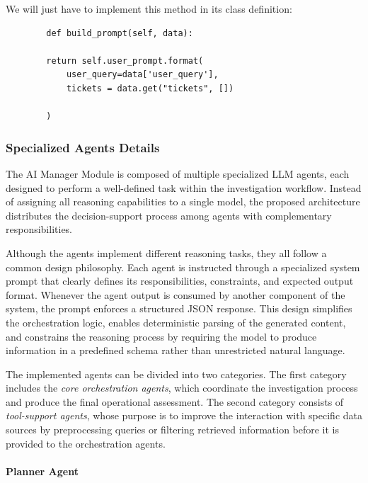 We will just have to implement this method in its class definition:
\begin{verbatim}
        def build_prompt(self, data):

        return self.user_prompt.format(
            user_query=data['user_query'],
            tickets = data.get("tickets", [])

        )
\end{verbatim}


\subsubsection{Specialized Agents Details}

The AI Manager Module is composed of multiple specialized LLM agents, each designed to perform a well-defined task within the investigation workflow. Instead of assigning all reasoning capabilities to a single model, the proposed architecture distributes the decision-support process among agents with complementary responsibilities.

Although the agents implement different reasoning tasks, they all follow a common design philosophy. Each agent is instructed through a specialized system prompt that clearly defines its responsibilities, constraints, and expected output format. Whenever the agent output is consumed by another component of the system, the prompt enforces a structured JSON response. This design simplifies the orchestration logic, enables deterministic parsing of the generated content, and constrains the reasoning process by requiring the model to produce information in a predefined schema rather than unrestricted natural language.

The implemented agents can be divided into two categories. The first category includes the \textit{core orchestration agents}, which coordinate the investigation process and produce the final operational assessment. The second category consists of \textit{tool-support agents}, whose purpose is to improve the interaction with specific data sources by preprocessing queries or filtering retrieved information before it is provided to the orchestration agents.

\paragraph{Planner Agent}

